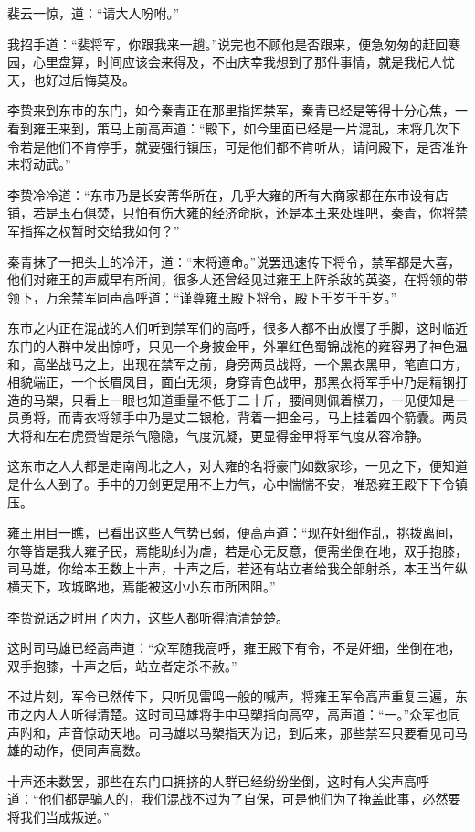 裴云一惊，道：“请大人吩咐。”

我招手道：“裴将军，你跟我来一趟。”说完也不顾他是否跟来，便急匆匆的赶回寒园，心里盘算，时间应该会来得及，不由庆幸我想到了那件事情，就是我杞人忧天，也好过后悔莫及。

李贽来到东市的东门，如今秦青正在那里指挥禁军，秦青已经是等得十分心焦，一看到雍王来到，策马上前高声道：“殿下，如今里面已经是一片混乱，末将几次下令若是他们不肯停手，就要强行镇压，可是他们都不肯听从，请问殿下，是否准许末将动武。”

李贽冷冷道：“东市乃是长安菁华所在，几乎大雍的所有大商家都在东市设有店铺，若是玉石俱焚，只怕有伤大雍的经济命脉，还是本王来处理吧，秦青，你将禁军指挥之权暂时交给我如何？”

秦青抹了一把头上的冷汗，道：“末将遵命。”说罢迅速传下将令，禁军都是大喜，他们对雍王的声威早有所闻，很多人还曾经见过雍王上阵杀敌的英姿，在将领的带领下，万余禁军同声高呼道：“谨尊雍王殿下将令，殿下千岁千千岁。”

东市之内正在混战的人们听到禁军们的高呼，很多人都不由放慢了手脚，这时临近东门的人群中发出惊呼，只见一个身披金甲，外罩红色蜀锦战袍的雍容男子神色温和，高坐战马之上，出现在禁军之前，身旁两员战将，一个黑衣黑甲，笔直口方，相貌端正，一个长眉凤目，面白无须，身穿青色战甲，那黑衣将军手中乃是精钢打造的马槊，只看上一眼也知道重量不低于二十斤，腰间则佩着横刀，一见便知是一员勇将，而青衣将领手中乃是丈二银枪，背着一把金弓，马上挂着四个箭囊。两员大将和左右虎赍皆是杀气隐隐，气度沉凝，更显得金甲将军气度从容冷静。

这东市之人大都是走南闯北之人，对大雍的名将豪门如数家珍，一见之下，便知道是什么人到了。手中的刀剑更是用不上力气，心中惴惴不安，唯恐雍王殿下下令镇压。

雍王用目一瞧，已看出这些人气势已弱，便高声道：“现在奸细作乱，挑拨离间，尔等皆是我大雍子民，焉能助纣为虐，若是心无反意，便需坐倒在地，双手抱膝，司马雄，你给本王数上十声，十声之后，若还有站立者给我全部射杀，本王当年纵横天下，攻城略地，焉能被这小小东市所困阻。”

李贽说话之时用了内力，这些人都听得清清楚楚。

这时司马雄已经高声道：“众军随我高呼，雍王殿下有令，不是奸细，坐倒在地，双手抱膝，十声之后，站立者定杀不赦。”

不过片刻，军令已然传下，只听见雷鸣一般的喊声，将雍王军令高声重复三遍，东市之内人人听得清楚。这时司马雄将手中马槊指向高空，高声道：“一。”众军也同声附和，声音惊动天地。司马雄以马槊指天为记，到后来，那些禁军只要看见司马雄的动作，便同声高数。

十声还未数罢，那些在东门口拥挤的人群已经纷纷坐倒，这时有人尖声高呼道：“他们都是骗人的，我们混战不过为了自保，可是他们为了掩盖此事，必然要将我们当成叛逆。”

